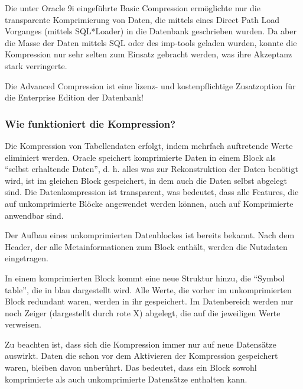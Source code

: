         Die unter Oracle 9i eingef\"uhrte Basic Compression erm\"oglichte nur die transparente Komprimierung von Daten, die mittels eines Direct Path Load Vorganges (mittels SQL*Loader) in die Datenbank geschrieben wurden. Da aber die Masse der Daten mittels SQL oder des imp-tools geladen wurden, konnte die Kompression nur sehr selten zum Einsatz gebracht werden, was ihre Akzeptanz stark verringerte.
        \begin{merke}
          Die Advanced Compression ist eine lizenz- und kostenpflichtige Zusatzoption f\"ur die Enterprise Edition der Datenbank!
        \end{merke}
        \subsubsection{Wie funktioniert die Kompression?}
          Die Kompression von Tabellendaten erfolgt, indem mehrfach auftretende Werte eliminiert werden. Oracle speichert komprimierte Daten in einem Block als \enquote{selbst erhaltende Daten}, d. h. alles was zur Rekonstruktion der Daten ben\"otigt wird, ist im gleichen Block gespeichert, in dem auch die Daten selbst abgelegt sind. Die Datenkompression ist transparent, was bedeutet, dass alle Features, die auf unkomprimierte Bl\"ocke angewendet werden k\"onnen, auch auf Komprimierte anwendbar sind.

          Der Aufbau eines unkomprimierten Datenblockes ist bereits bekannt. Nach dem Header, der alle Metainformationen zum Block enth\"alt, werden die Nutzdaten eingetragen.

          In einem komprimierten Block kommt eine neue Struktur hinzu, die \enquote{Symbol table}, die in  blau dargestellt wird. Alle Werte, die vorher im unkomprimierten Block redundant waren, werden in ihr gespeichert. Im Datenbereich werden nur noch Zeiger (dargestellt durch rote X) abgelegt, die auf die jeweiligen Werte verweisen.
          \begin{merke}
            Zu beachten ist, dass sich die Kompression immer nur auf neue Datens\"atze auswirkt. Daten die schon vor dem Aktivieren der Kompression gespeichert waren, bleiben davon unber\"uhrt. Das bedeutet, dass ein Block sowohl komprimierte als auch unkomprimierte Datens\"atze enthalten kann.
          \end{merke}
